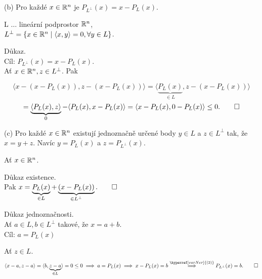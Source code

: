 \begin{multicols}{2}
    (b) Pro každé $x \in \mathbb{R}^n$ je $P_{L^\perp} (x) = x - P_L (x)$.

    L $\dots$ lineární podprostor $\mathbb{R}^n$,\\
    $L^\perp = \left\lbrace x \in \mathbb{R}^n \mid \langle x, y\rangle = 0, \forall y \in L \right\rbrace$.

    Důkaz.\\
    Cíl: $P_{L^\perp} (x) = x - P_L(x)$.\\
    Ať $x \in \mathbb{R}^n, z \in L^\perp$. Pak

\columnbreak

\end{multicols}

\[
    \langle x - (x - P_L(x)), z - (x - P_L(x))\rangle = \langle \underbrace{P_L(x)}_{\in L}, z - (x - P_L(x))\rangle
\]
\[
    = \underbrace{\langle P_L (x), z\rangle}_0 - \langle P_L (x), x-P_L(x)\rangle = \langle x - P_L (x), 0 - P_L(x)\rangle \leq 0. \qed
\]

(c) Pro každé $x \in \mathbb{R}^n$ existují jednoznačně určené body $y \in L$ a $z \in L^\perp$ tak, že $x=y + z$. Navíc 
$y = P_L(x)$ a $z=P_{L^ \perp} (x)$.

Ať $x \in \mathbb{R}^n$.

Důkaz existence.\\
Pak  $x = \underbrace{P_L (x)}_{\in L} + \underbrace{(x - P_L (x))}_{\in L^\perp}. \qed$

Důkaz jednoznačnosti.\\
Ať $a \in L, b \in L^\perp$ takové, že $x = a+b$.\\
Cíl: $a = P_L (x)$

Ať $z \in L$.
\[
    \langle x-a, z-a\rangle = \langle b, \underbrace{z-a}_{\in L}\rangle = 0 \leq 0 \implies a = P_L (x) \implies 
    x - P_L(x) = b \stackrel{\hyperref[varNer]{(2)}}{\implies} P_{L^\perp} (x) = b. \qed
\]